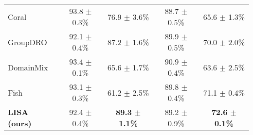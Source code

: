 \begin{table*}[h]
\begin{center}
\begin{tabular}{l|cc|cc}
Coral &  93.8 $\pm$ 0.3\% & 76.9 $\pm$ 3.6\% & 88.7 $\pm$ 0.5\% & 65.6 $\pm$ 1.3\% \\
GroupDRO & 92.1 $\pm$ 0.4\% & 87.2 $\pm$ 1.6\% & 89.9 $\pm$ 0.5\% & 70.0 $\pm$ 2.0\% \\
DomainMix  & 93.4 $\pm$ 0.1\% & 65.6 $\pm$ 1.7\% & 90.9 $\pm$ 0.4\% & 63.6 $\pm$ 2.5\% \\
Fish &  93.1 $\pm$ 0.3\%  &  61.2 $\pm$ 2.5\% & 89.8 $\pm$ 0.4\% & 71.1 $\pm$ 0.4\%  \\\midrule
\textbf{LISA (ours)} & 92.4 $\pm$ 0.4\% & \textbf{89.3 $\pm$ 1.1\%} & 89.2 $\pm$ 0.9\% & \textbf{72.6 $\pm$ 0.1\%}\\
\bottomrule
\end{tabular}
\end{center}
\end{table*}


